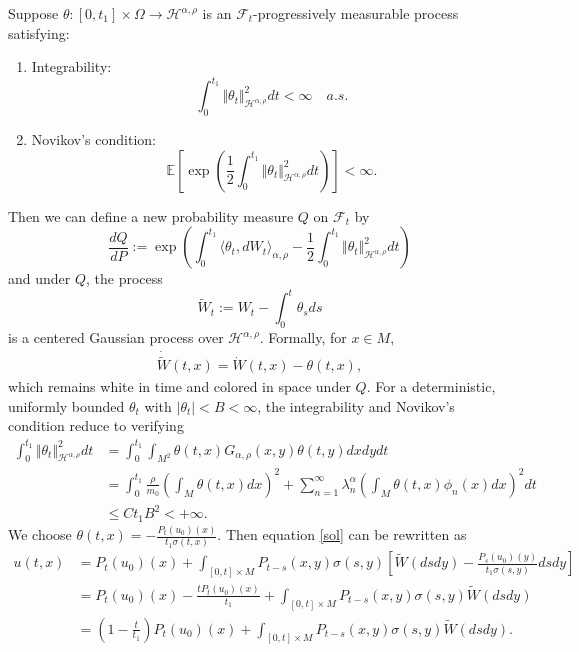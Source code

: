 \documentclass[12pt]{amsart}
\numberwithin{equation}{section}
\newcommand{\E}{\mathbb{E}}
\newcommand{\1}{\mathbf{1}}
\begin{document}
Suppose $\theta:[0,{t_1}]\times\Omega\to\mathcal{H}^{\alpha,\rho}$ is an $\mathcal{F}_t$-progressively measurable process satisfying:
\begin{enumerate}
    \item Integrability:
    \begin{equation*}
        \int_0^{t_1}\Vert \theta_t\Vert^2_{\mathcal{H}^{\alpha,\rho}}dt<\infty\quad a.s.
    \end{equation*}
    \item Novikov's condition:
    \begin{equation*}
        \E\left[\exp\left(\frac{1}{2}\int_0^{t_1}\Vert \theta_t\Vert^2_{\mathcal{H}^{\alpha,\rho}}dt\right)\right]<\infty.
    \end{equation*}
\end{enumerate}
Then we can define a new probability measure $Q$ on $\mathcal{F}_t$ by
\begin{equation*}
    \frac{dQ}{dP} := \exp\left(\int_0^{t_1}\langle\theta_t,dW_t\rangle_{\alpha,\rho}-\frac{1}{2}\int_0^{t_1}\Vert \theta_t\Vert^2_{\mathcal{H}^{\alpha,\rho}}dt\right)
\end{equation*}
and under $Q$, the process
\begin{equation*}
    \widetilde{W}_t:=W_t - \int_0^t\theta_sds
\end{equation*}
is a centered Gaussian process over $\mathcal{H}^{\alpha,\rho}$. Formally, for $x\in M$, 
\begin{align*}
\dot{\widetilde{W}}(t,x)=\dot{W}(t,x)-\theta(t,x),
\end{align*}
which remains white in time and colored in space under $Q$. For a deterministic, uniformly bounded $\theta_t$ with $\vert\theta_t\vert<B<\infty$, the integrability and Novikov's condition reduce to verifying
\begin{equation}
\begin{split}
\label{novi}
\int_0^{t_1}\Vert \theta_t\Vert^2_{\mathcal{H}^{\alpha,\rho}}dt&=\int_0^{t_1}\int_{M^2}\theta(t,x)G_{\alpha,\rho}(x,y)\theta(t,y)dxdydt\\
&=\int_0^{t_1}\frac{\rho}{m_0}\left(\int_M\theta(t,x)dx\right)^2 + \sum_{n=1}^\infty\lambda_n^{\alpha}\left(\int_M\theta(t,x)\phi_n(x)dx\right)^2dt\\
&\leq C{t_1}B^2<+\infty.
\end{split}
\end{equation}
We choose $\theta(t,x)=-\frac{P_t(u_0)(x)}{t_1\sigma(t,x)}$. Then equation \eqref{sol} can be rewritten as
\begin{align*}
u(t,x)&=P_t(u_0)(x)+\int_{[0,t]\times M}P_{t-s}(x,y)\sigma(s,y)\left[\widetilde{W}(dsdy)-\frac{P_s(u_0)(y)}{t_1\sigma(s,y)}dsdy\right]\\
&=P_t(u_0)(x)-\frac{tP_t(u_0)(x)}{t_1}+\int_{[0,t]\times M}P_{t-s}(x,y)\sigma(s,y)\widetilde{W}(dsdy)\\
&=\left(1-\frac{t}{t_1}\right)P_t(u_0)(x)+\int_{[0,t]\times M}P_{t-s}(x,y)\sigma(s,y)\widetilde{W}(dsdy).
\end{align*}
\end{document}
